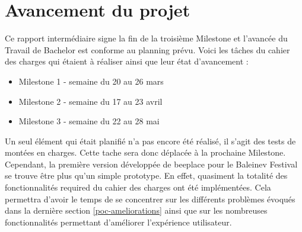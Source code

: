 \section{Avancement du projet}

Ce rapport intermédiaire signe la fin de la troisième Milestone et l'avancée du Travail de Bachelor est conforme au planning prévu. Voici les tâches du cahier des charges qui étaient à réaliser ainsi que leur état d'avancement :

\begin{itemize}
  \item Milestone 1 - semaine du 20 au 26 mars
  \item Milestone 2 - semaine du 17 au 23 avril
  \item Milestone 3 - semaine du 22 au 28 mai
\end{itemize}

Un seul élément qui était planifié n'a pas encore été réalisé, il s'agit des tests de montées en charges. Cette tache sera donc déplacée à la prochaine Milestone. Cependant, la première version développée de \gls{beeplace} pour le Baleinev Festival se trouve être plus qu'un simple prototype. En effet, quasiment la totalité des fonctionnalités \guillemotleft{} required \guillemotright{} du cahier des charges ont été implémentées. Cela permettra d'avoir le temps de se concentrer sur les différents problèmes évoqués dans la dernière section \ref{poc-ameliorations} ainsi que sur les nombreuses fonctionnalités permettant d'améliorer l'expérience utilisateur.

